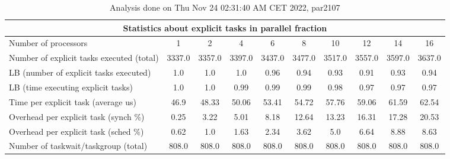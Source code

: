 \begin{table}[h]
\begin{center}
\begin{tabular}{|l|c|c|c|c|c|c|c|c|c|}
\hline
\multicolumn{10}{|c|}{Statistics about explicit tasks in parallel fraction} \\
\hline
\hline
Number of processors & 1 & 2 & 4 & 6 & 8 & 10 & 12 & 14 & 16 \\
\hline
\hline
Number of explicit tasks executed (total)        &          3337.0 &          3357.0 &          3397.0 &          3437.0 &          3477.0 &          3517.0 &          3557.0 &          3597.0 &          3637.0 \\
\hline
LB (number of explicit tasks executed)           &             1.0 &             1.0 &             1.0 &            0.96 &            0.94 &            0.93 &            0.91 &            0.93 &            0.94 \\
\hline
LB (time executing explicit tasks)               &             1.0 &             1.0 &            0.99 &            0.99 &            0.99 &            0.98 &            0.97 &            0.97 &            0.97 \\
\hline
Time per explicit task (average us)                 &            46.9 &           48.33 &           50.06 &           53.41 &           54.72 &           57.76 &           59.06 &           61.59 &           62.54 \\
\hline
Overhead per explicit task (synch \%)             &            0.25 &            3.22 &            5.01 &            8.18 &           12.64 &           13.23 &           16.31 &           17.28 &           20.53 \\
\hline
Overhead per explicit task (sched \%)             &            0.62 &             1.0 &            1.63 &            2.34 &            3.62 &             5.0 &            6.64 &            8.88 &            8.63 \\
\hline
Number of taskwait/taskgroup (total)             &           808.0 &           808.0 &           808.0 &           808.0 &           808.0 &           808.0 &           808.0 &           808.0 &           808.0 \\
\hline
\end{tabular}
\end{center}
\caption{ Analysis done on Thu Nov 24 02:31:40 AM CET 2022, par2107}
\end{table}
